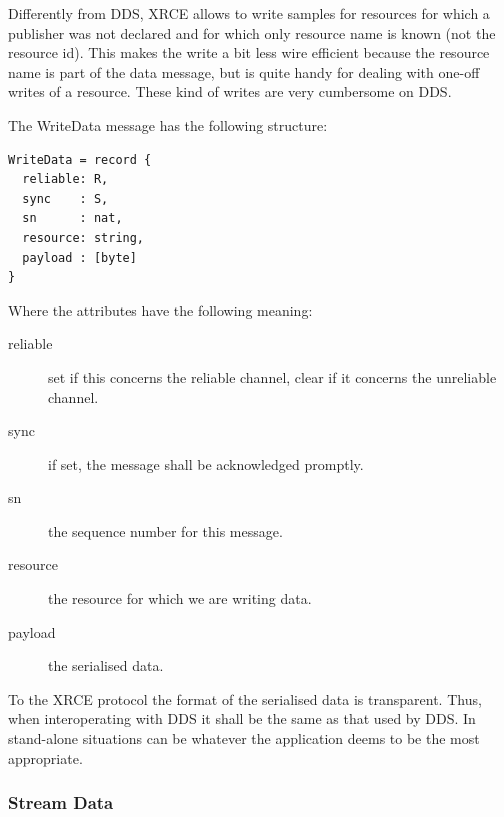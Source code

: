 \documentclass[a4paper,oneside,article]{memoir}
\begin{document}
Differently from DDS, XRCE allows to write samples for resources for which a publisher was not
declared and for which only resource name is known (not the resource id).  This makes the write a
bit less wire efficient because the resource name is part of the data message, but is quite handy
for dealing with one-off writes of a resource.  These kind of writes are very cumbersome on DDS\@.

The WriteData message has the following structure:
\begin{verbatim}
WriteData = record {
  reliable: R,
  sync    : S,
  sn      : nat,
  resource: string,
  payload : [byte]
}
\end{verbatim}
Where the attributes have the following meaning:
\begin{description}
\item[reliable] set if this concerns the reliable channel, clear if it concerns the unreliable
  channel.
\item[sync] if set, the message shall be acknowledged promptly.
\item[sn] the sequence number for this message.
\item[resource] the resource for which we are writing data.
\item[payload] the serialised data.
\end{description}
To the XRCE protocol the format of the serialised data is transparent.  Thus, when
interoperating with DDS it shall be the same as that used by DDS\@.  In stand-alone situations can
be whatever the application deems to be the most appropriate.

\subsubsection{Stream Data}
\end{document}
